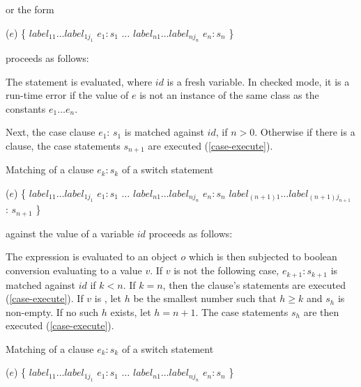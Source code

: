 \documentclass{article}
\begin{document}
or the form

\begin{dartCode}
\SWITCH{} ($e$) \{
   $label_{11} \ldots label_{1j_1}$ \CASE{} $e_1: s_1$
   $\ldots$
   $label_{n1} \ldots label_{nj_n}$ \CASE{} $e_n: s_n$
\}
\end{dartCode}

proceeds as follows:

\LMHash{}
The statement  is evaluated, where $id$ is a fresh variable.
In checked mode, it is a run-time error if the value of $e$ is not an instance of the same class as the constants $e_1 \ldots e_n$.


\LMHash{}
Next, the case clause \CASE{} $e_{1}$: $s_{1}$ is matched against $id$, if $n > 0$.
Otherwise if there is a \DEFAULT{} clause, the case statements $s_{n+1}$ are executed (\ref{case-execute}).

\LMHash{}
Matching of a \CASE{} clause \CASE{} $e_{k}: s_{k}$ of a switch statement

\begin{dartCode}
\SWITCH{} ($e$) \{
   $label_{11} \ldots label_{1j_1}$ \CASE{} $e_1: s_1$
   $\ldots$
   $label_{n1} \ldots label_{nj_n}$ \CASE{} $e_n: s_n$
   $label_{(n+1)1} \ldots label_{(n+1)j_{n+1}}$ \DEFAULT{}: $s_{n+1}$
\}
\end{dartCode}

against the value of a variable $id$ proceeds as follows:

\LMHash{}
The expression  is evaluated to an object $o$ which is then subjected to boolean conversion evaluating to a value $v$.
If $v$ is not \TRUE{} the following case, \CASE{} $e_{k+1}: s_{k+1}$ is matched against $id$ if $k < n$.
If $k = n$, then the \DEFAULT{} clause's statements are executed (\ref{case-execute}).
If $v$ is \TRUE{}, let $h$ be the smallest number such that $h \ge k$ and $s_h$ is non-empty.
If no such $h$ exists, let $h = n + 1$.
The case statements $s_h$ are then executed (\ref{case-execute}).

\LMHash{}
Matching of a \CASE{} clause \CASE{} $e_{k}: s_{k}$ of a switch statement

\begin{dartCode}
\SWITCH{} ($e$) \{
   $label_{11} \ldots label_{1j_1}$ \CASE{} $e_1: s_1$
   $\ldots$
   $label_{n1} \ldots label_{nj_n}$ \CASE{} $e_n: s_n$
\}
\end{dartCode}
\end{document}
